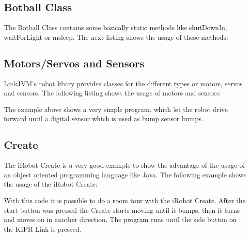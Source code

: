 \documentclass{juniorjournal}
\begin{document}
\subsection{Botball Class}
The Botball\cite{Botball} Class contains some basically static methods like shutDownIn, 
waitForLight or msleep.
The next listing shows the usage of these methods:


\subsection{Motors/Servos and Sensors}
LinkJVM's robot libary provides classes for the different types or motors, servos and sensors.
The following listing shows the usage of motors and sensors:

The example above shows a very simple program, which let the robot drive forward 
until a digital sensor which is used as bump sensor bumps.

\subsection{Create}
The iRobot Create\cite{create} is a very good example to show the advantage of the usage of 
an object oriented programming language like Java\cite{Java}.
The following example shows the usage of the iRobot Create\cite{create}:

With this code it is possible to do a room tour with the iRobot Create\cite{create}.
After the start button was pressed the Create\cite{create} starts moving until it bumps, then 
it turns and moves on in another direction. The program runs until the side 
button on the KIPR\cite{KIPR} Link\cite{link} is pressed.
\end{document}
